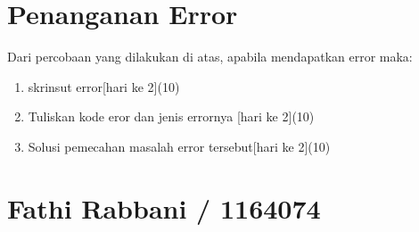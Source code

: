 \section{Penanganan Error}
Dari percobaan yang dilakukan di atas, apabila mendapatkan error maka:

\begin{enumerate}
	\item
	skrinsut error[hari ke 2](10)
	\item
Tuliskan kode eror dan jenis errornya [hari ke 2](10)
	\item
Solusi pemecahan masalah error tersebut[hari ke 2](10)

\end{enumerate}


\section{Fathi Rabbani / 1164074}
